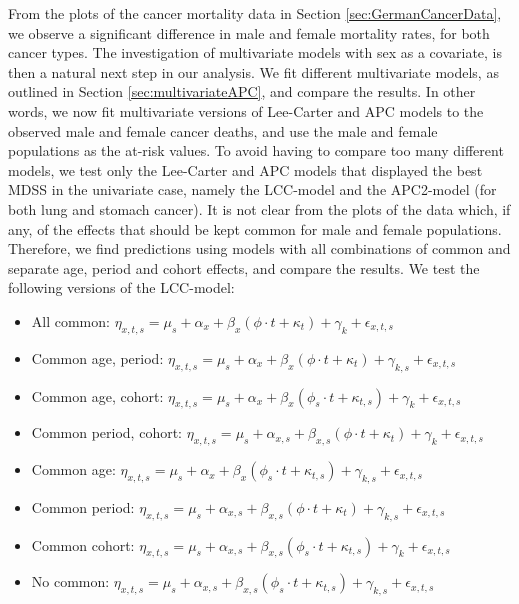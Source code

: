 From the plots of the cancer mortality data in Section \ref{sec:GermanCancerData}, we observe a significant difference in male and female mortality rates, for both cancer types. The investigation of multivariate models with sex as a covariate, is then a natural next step in our analysis. We fit different multivariate models, as outlined in Section \ref{sec:multivariateAPC}, and compare the results. In other words, we now fit multivariate versions of Lee-Carter and APC models to the observed male and female cancer deaths, and use the male and female populations as the at-risk values. To avoid having to compare too many different models, we test only the Lee-Carter and APC models that displayed the best MDSS in the univariate case, namely the LCC-model and the APC2-model (for both lung and stomach cancer). It is not clear from the plots of the data which, if any, of the effects that should be kept common for male and female populations. Therefore, we find predictions using models with all combinations of common and separate age, period and cohort effects, and compare the results. We test the following versions of the LCC-model:
\begin{itemize}
    \item All common: $\eta_{x,t,s} = \mu_s + \alpha_x + \beta_x(\phi\cdot t + \kappa_t) + \gamma_k + \epsilon_{x,t,s}$
    \item Common age, period: $\eta_{x,t,s} = \mu_s + \alpha_x + \beta_x(\phi\cdot t + \kappa_t) + \gamma_{k,s} + \epsilon_{x,t,s}$
    \item Common age, cohort: $\eta_{x,t,s} = \mu_s + \alpha_x + \beta_x(\phi_s\cdot t + \kappa_{t,s}) + \gamma_{k} + \epsilon_{x,t,s}$
    \item Common period, cohort: $\eta_{x,t,s} = \mu_s + \alpha_{x,s} + \beta_{x,s}(\phi\cdot t + \kappa_t) + \gamma_{k} + \epsilon_{x,t,s}$
    \item Common age: $\eta_{x,t,s} = \mu_s + \alpha_x + \beta_x(\phi_s\cdot t + \kappa_{t,s}) + \gamma_{k,s} + \epsilon_{x,t,s}$
    \item Common period: $\eta_{x,t,s} = \mu_s + \alpha_{x,s} + \beta_{x,s}(\phi\cdot t + \kappa_{t}) + \gamma_{k,s} + \epsilon_{x,t,s}$
    \item Common cohort: $\eta_{x,t,s} = \mu_s + \alpha_{x,s} + \beta_{x,s}(\phi_s\cdot t + \kappa_{t,s}) + \gamma_{k} + \epsilon_{x,t,s}$
    \item No common: $\eta_{x,t,s} = \mu_s + \alpha_{x,s} + \beta_{x,s}(\phi_s\cdot t + \kappa_{t,s}) + \gamma_{k,s} + \epsilon_{x,t,s}$
\end{itemize}
